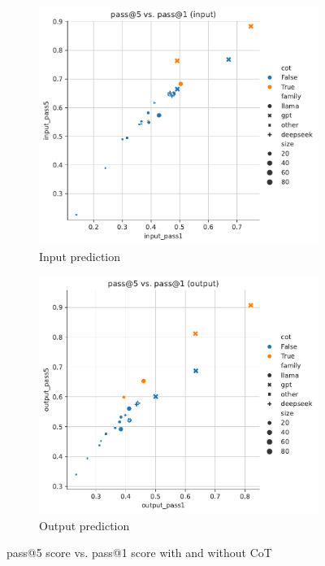 \documentclass{article}
\begin{document}
\begin{figure}[H]
     \centering
     \begin{subfigure}[b]{0.49\textwidth}
         \centering
         \includegraphics[scale=0.45]{figs/scatter/input_pass_5v1.pdf}
         \caption{Input prediction}
         \label{fig:pass5-vs-pass1-cot-input}
     \end{subfigure}
     \hfill
     \begin{subfigure}[b]{0.49\textwidth}
         \centering
         \includegraphics[scale=0.45]{figs/scatter/output_pass_5v1.pdf}
         \caption{Output prediction}
         \label{fig:pass5-vs-pass1-cot-output}
     \end{subfigure}
     \caption{pass@5 score vs. pass@1 score with and without CoT}
     \label{fig:pass5-vs-pass1-cot}
\end{figure}
\end{document}
